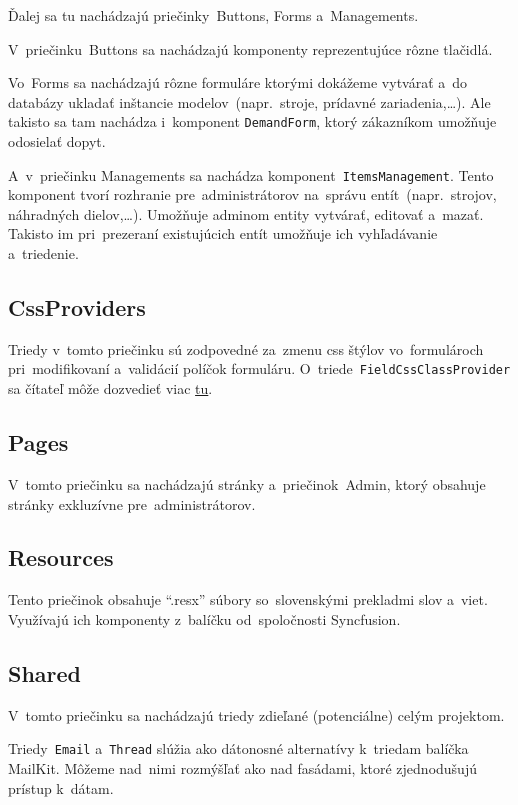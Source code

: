 Ďalej sa tu nachádzajú priečinky~Buttons, Forms a~Managements.

V~priečinku~Buttons sa nachádzajú komponenty reprezentujúce rôzne tlačidlá.

Vo~Forms sa nachádzajú rôzne formuláre ktorými dokážeme vytvárať a~do databázy ukladať inštancie modelov~(napr.~stroje, prídavné zariadenia,\dots). Ale takisto sa tam nachádza i~komponent \verb|DemandForm|, ktorý zákazníkom umožňuje odosielať dopyt.

A~v~priečinku Managements sa nachádza komponent~\verb|ItemsManagement|. Tento komponent tvorí rozhranie pre~administrátorov na~správu entít~(napr.~strojov, náhradných dielov,\dots). Umožňuje adminom entity vytvárať, editovať a~mazať. Takisto im pri~prezeraní existujúcich entít umožňuje ich vyhľadávanie a~triedenie.

\subsection{CssProviders}

Triedy v~tomto priečinku sú zodpovedné za~zmenu css štýlov vo~formulároch pri~modifikovaní a~validácií políčok formuláru. O~triede~\verb|FieldCssClassProvider| sa čítateľ môže dozvedieť viac \href{https://learn.microsoft.com/en-us/dotnet/api/microsoft.aspnetcore.components.forms.fieldcssclassprovider?view=aspnetcore-7.0}{tu}.

\subsection{Pages}

V~tomto priečinku sa nachádzajú stránky a~priečinok~Admin, ktorý obsahuje stránky exkluzívne pre~administrátorov.

\subsection{Resources}

Tento priečinok obsahuje ``.resx'' súbory so~slovenskými prekladmi slov a~viet. Využívajú ich komponenty z~balíčku od~spoločnosti Syncfusion.

\subsection{Shared}

V~tomto priečinku sa nachádzajú triedy zdieľané (potenciálne) celým projektom.

Triedy~\verb|Email| a~\verb|Thread| slúžia ako dátonosné alternatívy k~triedam balíčka MailKit. Môžeme nad~nimi rozmýšľať ako nad fasádami, ktoré zjednodušujú prístup k~dátam.

